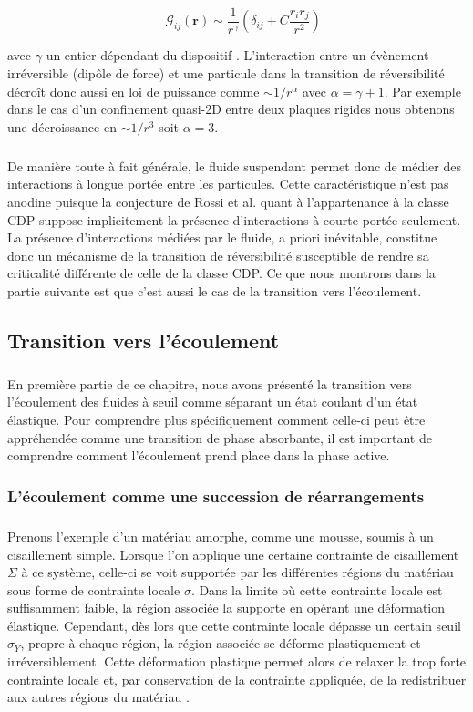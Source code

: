 \begin{equation}
\quad \mathcal{G}_{ij}(\mathbf{r}) \sim \frac{1}{r^\gamma}\left( \delta_{ij}+ C\frac{r_ir_j}{r^2} \right)
\end{equation}

\noindent avec $\gamma$ un entier dépendant du dispositif \cite{diamant_hydrodynamic_2009}. L'interaction entre un évènement irréversible (dipôle de force) et une particule dans la transition de réversibilité décroît donc aussi en loi de puissance comme $\sim 1/r^\alpha$ avec $\alpha = \gamma+1$. Par exemple dans le cas d'un confinement quasi-2D entre deux plaques rigides nous obtenons une décroissance en $\sim 1/r^3$ soit $\alpha = 3$.

\subparagraph{}De manière toute à fait générale, le fluide suspendant permet donc de médier des interactions à longue portée entre les particules. Cette caractéristique n'est pas anodine puisque la conjecture de Rossi et al. \cite{rossi_universality_2000} quant à l'appartenance à la classe CDP suppose implicitement la présence d'interactions à courte portée seulement. La présence d'interactions médiées par le fluide, a priori inévitable, constitue donc un mécanisme de la transition de réversibilité susceptible de rendre sa criticalité différente de celle de la classe CDP. Ce que nous montrons dans la partie suivante est que c'est aussi le cas de la transition vers l'écoulement.

\subsection{Transition vers l'écoulement}

\label{sec:yieldingCDP}

\subparagraph{}En première partie de ce chapitre, nous avons présenté la transition vers l'écoulement des fluides à seuil comme séparant un état coulant d'un état élastique. Pour comprendre plus spécifiquement comment celle-ci peut être appréhendée comme une transition de phase absorbante, il est important de comprendre comment l'écoulement prend place dans la phase active.

\subsubsection{L'écoulement comme une succession de réarrangements}

\subparagraph{}Prenons l'exemple d'un matériau amorphe, comme une mousse, soumis à un cisaillement simple. Lorsque l'on applique une certaine contrainte de cisaillement $\Sigma$ à ce système, celle-ci se voit supportée par les différentes régions du matériau sous forme de contrainte locale $\sigma$. Dans la limite où cette contrainte locale est suffisamment faible, la région associée la supporte en opérant une déformation élastique. Cependant, dès lors que cette contrainte locale dépasse un certain seuil $\sigma_Y$, propre à chaque région, la région associée se déforme plastiquement et irréversiblement. Cette déformation plastique permet alors de relaxer la trop forte contrainte locale et, par conservation de la contrainte appliquée, de la redistribuer aux autres régions du matériau \cite{nicolas_deformation_2018}. 

